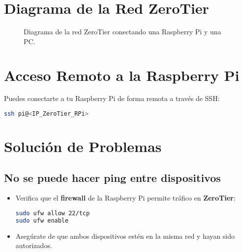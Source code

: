 \section{Diagrama de la Red ZeroTier}
\begin{figure}[htbp]
    \centering
    \caption{Diagrama de la red ZeroTier conectando una Raspberry Pi y una PC.}
\end{figure}


\section{Acceso Remoto a la Raspberry Pi}
Puedes conectarte a tu Raspberry Pi de forma remota a través de SSH:
\begin{lstlisting}[language=bash]
ssh pi@<IP_ZeroTier_RPi>
\end{lstlisting}


\section{Solución de Problemas}

\subsection{No se puede hacer ping entre dispositivos}
\begin{itemize}
    \item Verifica que el \textbf{firewall} de la Raspberry Pi permite tráfico en \textbf{ZeroTier}:
    \begin{lstlisting}[language=bash]
sudo ufw allow 22/tcp
sudo ufw enable
    \end{lstlisting}
    \item Asegúrate de que ambos dispositivos estén en la misma red y hayan sido autorizados.
\end{itemize}

